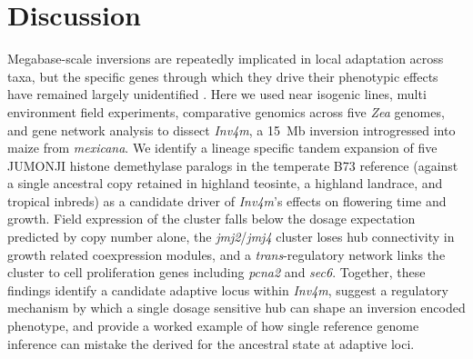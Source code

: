 \documentclass[9pt,twocolumn,twoside]{rilabRxiv}
\newcommand{\mex}{\textit{mexicana}\xspace}
\newcommand{\invfour}{\textit{Inv4m}\xspace}
\newcommand{\jmjii}{\textit{jmj2}\xspace}
\newcommand{\jmjiv}{\textit{jmj4}\xspace}
\begin{document}
\section{Discussion}
Megabase-scale inversions are repeatedly implicated in local adaptation across taxa, but the specific genes through which they drive their phenotypic effects have remained largely unidentified \citep{wellenreuther2018, kirkpatrick2006, kirkpatrick2010}.
Here we used near isogenic lines, multi environment field experiments, comparative genomics across five \textit{Zea} genomes, and gene network analysis to dissect \invfour, a 15~Mb inversion introgressed into maize from \mex.
We identify a lineage specific tandem expansion of five JUMONJI histone demethylase paralogs in the temperate B73 reference (against a single ancestral copy retained in highland teosinte, a highland landrace, and tropical inbreds) as a candidate driver of \invfour's effects on flowering time and growth.
Field expression of the cluster falls below the dosage expectation predicted by copy number alone, the \jmjii/\jmjiv cluster loses hub connectivity in growth related coexpression modules, and a \textit{trans}-regulatory network links the cluster to cell proliferation genes including \textit{pcna2} and \textit{sec6}.
Together, these findings identify a candidate adaptive locus within \invfour, suggest a regulatory mechanism by which a single dosage sensitive hub can shape an inversion encoded phenotype, and provide a worked example of how single reference genome inference can mistake the derived for the ancestral state at adaptive loci.
\end{document}
